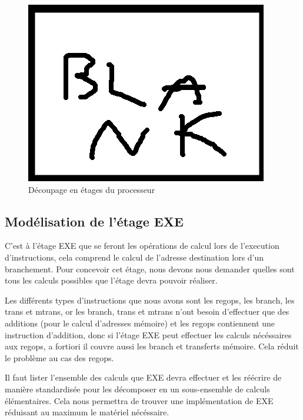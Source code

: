 \documentclass{article}
\begin{document}
\begin{figure}[ht]
\includegraphics[scale=1]{pics/blank.png}
\centering
\caption{Découpage en étages du processeur}
\label{etages}
\end{figure}

\subsection{Modélisation de l'étage EXE}

\par
C'est à l'étage EXE que se feront les opérations de calcul lors de l'execution d'instructions,
cela comprend le calcul de l'adresse destination lors d'un branchement.
Pour concevoir cet étage, nous devons nous demander quelles sont tous les calculs possibles
que l'étage devra pouvoir réaliser.

\par
Les différents types d'instructions que nous avons sont les regops, les branch, les trans et mtrans,
or les branch, trans et mtrans n'ont besoin d'effectuer que des additions (pour le calcul d'adresses
mémoire) et les regops contiennent une instruction d'addition, donc si l'étage EXE peut effectuer
les calculs nécéssaires aux regops, a fortiori il couvre aussi les branch et transferts mémoire.
Cela réduit le problème au cas des regops.

\par
Il faut lister l'ensemble des calculs que EXE devra effectuer et les réécrire
de manière standardisée pour les décomposer en un sous-ensemble de calculs élémentaires.
Cela nous permettra de trouver une implémentation de EXE réduisant au maximum le matériel nécéssaire.
\end{document}
